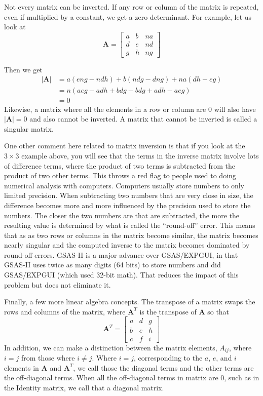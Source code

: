 Not every matrix can be inverted. If any row or column of the matrix is repeated, even if multiplied by a constant, we get a zero determinant. For example, let us look at 
$$
\mathbf{A} = 
\begin{bmatrix}
a & b & na \\
d & e & nd\\
g & h & ng
\end{bmatrix}
$$

Then we get 
\begin{align}
|\textbf{A}| &= a(eng-ndh) + b(ndg -dng) + na(dh-eg)\\
&=  n(aeg-adh + bdg -bdg + adh-aeg)\\
&= 0
\end{align}
Likewise, a matrix where all the elements in a row or column are 0 will also have $|\textbf{A}| = 0$ and also cannot be inverted. A matrix that cannot be inverted is called a singular matrix.

One other comment here related to matrix inversion is that if you look at the $3\times 3$ example above, you will see that the terms in the inverse matrix involve lots of difference terms, where the product of two terms is subtracted from the product of two other terms. This throws a red flag to people used to doing numerical analysis with computers. Computers usually store numbers to only limited precision. When subtracting two numbers that are very close in size, the difference becomes more and more influenced by the precision used to store the numbers. The closer the two numbers are that are subtracted, the more the resulting value is determined by what is called the ``round-off'' error. This means that as as two rows or columns in the matrix become similar, the matrix becomes nearly singular and the computed inverse to the matrix becomes dominated by round-off errors. GSAS-II is a major advance over GSAS/EXPGUI, in that GSAS-II uses twice as many digits (64 bits) to store numbers and did GSAS/EXPGUI (which used 32-bit math). That reduces the impact of this problem but does not eliminate it. 

Finally, a few more linear algebra concepts. The transpose of a matrix swaps the rows and columns of the matrix, where $\mathbf{A}^T$ is the transpose of $\mathbf{A}$ so that 
$$
\mathbf{A}^T = 
\begin{bmatrix}
a & d &  g \\
b & e & h\\
c & f & i
\end{bmatrix}
$$
In addition, we can make a distinction between the matrix elements, $A_{ij}$, where $i=j$ from those where $i\neq j$. Where $i=j$, corresponding to the $a$, $e$, and $i$ elements in $\textbf{A}$ and $\textbf{A}^T$, we call those the diagonal terms and the other terms are the off-diagonal terms. When all the off-diagonal terms in matrix are 0, such as in the Identity matrix, we call that a diagonal matrix.

